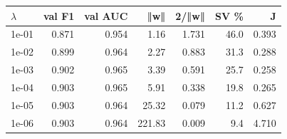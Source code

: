 \begin{tabular}{@{}lrrrrrr@{}}
\toprule
$\lambda$ & val F1 & val AUC & ‖w‖ & 2/‖w‖ & SV \% & J \\
\midrule
1e-01 & 0.871 & 0.954 & 1.16 & 1.731 & 46.0 & 0.393 \\
1e-02 & 0.899 & 0.964 & 2.27 & 0.883 & 31.3 & 0.288 \\
1e-03 & 0.902 & 0.965 & 3.39 & 0.591 & 25.7 & 0.258 \\
1e-04 & 0.903 & 0.965 & 5.91 & 0.338 & 19.8 & 0.265 \\
1e-05 & 0.903 & 0.964 & 25.32 & 0.079 & 11.2 & 0.627 \\
1e-06 & 0.903 & 0.964 & 221.83 & 0.009 & 9.4 & 4.710 \\
\bottomrule
\end{tabular}
